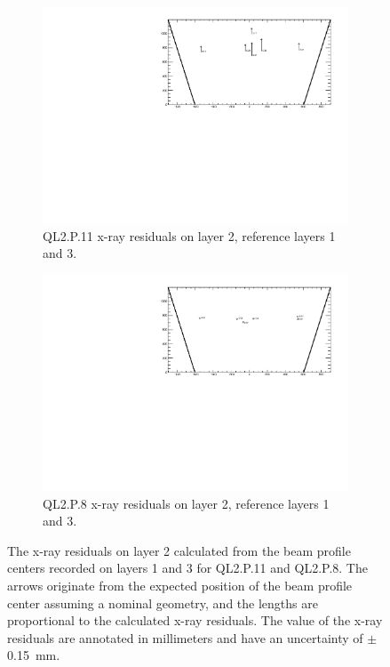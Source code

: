 \newpage
\thispagestyle{empty}
\begin{figure}
\centering
\begin{subfigure}{\textwidth}
  \centering
  \includegraphics[width=\linewidth]{figures/QL2P11_xray_residuals_layer2_fixedlayers13.pdf}
  \caption{QL2.P.11 x-ray residuals on layer 2, reference layers 1 and 3.}
  \label{fig:xray_res_th2_ql2p11}
\end{subfigure}%
\vspace*{\floatsep}
\begin{subfigure}{\textwidth}
  \centering
  \includegraphics[width=\linewidth]{figures/QL2P08_xray_residuals_layer2_fixedlayers13.pdf}
  \caption{QL2.P.8 x-ray residuals on layer 2, reference layers 1 and 3.}
  \label{fig:xray_res_th2_ql2p8}
\end{subfigure}
\caption{The x-ray residuals on layer 2 calculated from the beam profile centers recorded on layers 1 and 3 for QL2.P.11 and QL2.P.8. The arrows originate from the expected position of the beam profile center assuming a nominal geometry, and the lengths are proportional to the calculated x-ray residuals. The value of the x-ray residuals are annotated in millimeters and have an uncertainty of $\pm$\SI{0.15}{mm}.}
\label{fig:xray_res_th2}
\end{figure}
\newpage
\restoregeometry